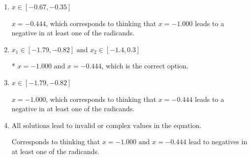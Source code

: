 \documentclass{extbook}[14pt]
\begin{document}
\begin{enumerate}
{\begin{enumerate}[label=\Alph*.]
$x = 0.444 \text{ and } x = 1.000$, which are the negative or absolute values of the values you would have gotten by solving the equation correctly.
\item \( x \in [-0.67,-0.35] \)

$x = -0.444$, which corresponds to thinking that $x = -1.000$ leads to a negative in at least one of the radicands.
\item \( x_1 \in [-1.79, -0.82] \text{ and } x_2 \in [-1.4,0.3] \)

* $x = -1.000 \text{ and } x = -0.444$, which is the correct option.
\item \( x \in [-1.79,-0.82] \)

$x = -1.000$, which corresponds to thinking that $x = -0.444$ leads to a negative in at least one of the radicands.
\item \( \text{All solutions lead to invalid or complex values in the equation.} \)

Corresponds to thinking that $x = -1.000 \text{ and } x = -0.444$ lead to negatives in at least one of the radicands.
\end{enumerate}

}
\end{enumerate}
\end{document}
